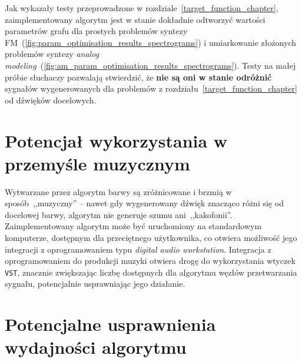 Jak wykazały testy przeprowadzone w rozdziale~\ref{target_function_chapter},
zaimplementowany algorytm jest w stanie dokładnie odtworzyć wartości
parametrów grafu dla prostych problemów syntezy
FM~(\ref{fig:param_optimisation_results_spectrograms})
i umiarkowanie złożonych problemów syntezy
\textit{analog modeling}~(\ref{fig:am_param_optimisation_results_spectrograms}).
Testy na małej próbie słuchaczy pozwalają stwierdzić,
że \textbf{nie są oni w stanie odróżnić} sygnałów wygenerowanych
dla problemów z rozdziału~\ref{target_function_chapter}
od dźwięków docelowych.



\section{Potencjał wykorzystania w przemyśle muzycznym}

Wytwarzane przez algorytm barwy są zróżnicowane i brzmią
w sposób~,,muzyczny'' -- nawet gdy wygenerowany dźwięk
znacząco różni się od docelowej barwy, algorytm nie generuje
szumu ani~,,kakofonii''. 
Zaimplementowany algorytm może być uruchomiony na standardowym komputerze,
dostępnym dla przeciętnego użytkownika, co otwiera możliwość jego integracji
z oprogramowaniem typu \textit{digital audio workstation}. Integracja
z oprogramowaniem do produkcji muzyki otwiera drogę do wykorzystania
wtyczek \texttt{VST}, znacznie zwiększając liczbę dostępnych
dla algorytmu węzłów przetwarzania sygnału, potencjalnie usprawniając
jego działanie.


\section{Potencjalne usprawnienia wydajności algorytmu}

